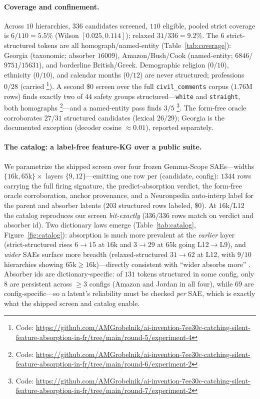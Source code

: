 \documentclass[11pt,letterpaper]{article}
\begin{document}
\paragraph{Coverage and confinement.} Across $10$ hierarchies, $336$ candidates screened, $110$ eligible, pooled strict coverage is $6/110=5.5\%$ (Wilson $[0.025,0.114]$); relaxed $31/336=9.2\%$. The $6$ strict-structured tokens are all homograph/named-entity (Table~\ref{tab:coverage}): Georgia (taxonomic; absorber $16009$), Amazon/Bush/Cook (named-entity; $6846$/$9751$/$15631$), and borderline British/Greek. Demographic religion ($0/10$), ethnicity ($0/10$), and calendar months ($0/12$) are never structured; professions $0/28$ (carried \footnote{Code: \url{https://github.com/AMGrobelnik/ai-invention-7ee30c-catching-silent-feature-absorption-in-fr/tree/main/round-5/experiment-4}}). A second \$$0$ screen over the full \texttt{civil\_comments} corpus ($1.76$M rows) finds exactly two of $44$ safety groups structured---\texttt{white} and \texttt{straight}, both homographs \footnote{Code: \url{https://github.com/AMGrobelnik/ai-invention-7ee30c-catching-silent-feature-absorption-in-fr/tree/main/round-6/experiment-2}}---and a named-entity pass finds $3/5$ \citep{Ahsan2025} \footnote{Code: \url{https://github.com/AMGrobelnik/ai-invention-7ee30c-catching-silent-feature-absorption-in-fr/tree/main/round-7/experiment-2}}. The form-free oracle corroborates $27/31$ structured candidates (lexical $26/29$); Georgia is the documented exception (decoder cosine $\approx0.01$), reported separately.

\paragraph{The catalog: a label-free feature-KG over a public suite.} We parametrize the shipped screen over four frozen Gemma-Scope SAEs---widths $\{16$k$,65$k$\}\times$ layers $\{9,12\}$---emitting one row per (candidate, config): $1344$ rows carrying the full firing signature, the predict-absorption verdict, the form-free oracle corroboration, anchor provenance, and a Neuronpedia auto-interp label for the parent and absorber latents ($203$ structured rows labeled, \$$0$). At $16$k/L12 the catalog reproduces our screen \emph{bit-exactly} ($336/336$ rows match on verdict and absorber id). Two dictionary laws emerge (Table~\ref{tab:catalog}, Figure~\ref{fig:catalog}): absorption is much more prevalent at the \emph{earlier} layer (strict-structured rises $6\to15$ at $16$k and $3\to29$ at $65$k going L12$\to$L9), and \emph{wider} SAEs surface more breadth (relaxed-structured $31\to62$ at L12, with $9/10$ hierarchies showing $65$k$\ge16$k)---directly consistent with ``wider absorbs more'' \citep{Karvonen2025, Chanin2025}. Absorber ids are dictionary-specific: of $131$ tokens structured in some config, only $8$ are persistent across $\ge3$ configs (Amazon and Jordan in all four), while $69$ are config-specific---so a latent's reliability must be checked \emph{per} SAE, which is exactly what the shipped screen and catalog enable.
\end{document}

